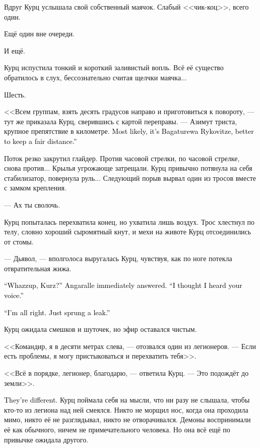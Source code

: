 \documentclass[a4paper,10pt,fleqn]{book}\usepackage{polyglossia}\setdefaultlanguage{english}\setotherlanguage{russian}\defaultfontfeatures{Ligatures=TeX,Mapping=tex-text}\usepackage{xcolor}\definecolor{lightgray}{HTML}{bbbbbb}\color{lightgray}\newcommand{\ml}[3]{\textcolor{black}{#3}}
\begin{document}
Вдруг Курц услышала свой собственный маячок.
Слабый <<чик-коц>>, всего один.

Ещё один вне очереди.

И ещё.

Курц испустила тонкий и короткий заливистый вопль.
Всё её существо обратилось в слух, бессознательно считая щелчки маячка...

Шесть.

<<Всем группам, взять десять градусов направо и приготовиться к повороту, --- тут же приказала Курц, сверившись с картой переправы.
--- Азимут триста, крупное препятствие в километре.
\ml{$0$}
{Скорее всего, это Багатурева Рыковице, от неё лучше держаться подальше>>.}
{Most likely, it's Bagaturewa Rykovitze, better to keep a fair distance.''}

Поток резко закрутил глайдер.
Против часовой стрелки, по часовой стрелке, снова против...
Крылья угрожающе затрещали.
Курц привычно потянула на себя стабилизатор, повернула руль...
Следующий порыв вырвал один из тросов вместе с замком крепления.

--- Ах ты сволочь.

Курц попыталась перехватила конец, но ухватила лишь воздух.
Трос хлестнул по телу, словно хороший сыромятный кнут, и мехи на животе Курц отсоединились от стомы.

--- Дьявол, --- вполголоса выругалась Курц, чувствуя, как по ноге потекла отвратительная жижа.

\ml{$0$}
{<<Что такое, Курц? --- тут же отозвалась Анкарьяль.}
{``Whazzup, Kurz?'' Angaralle immediately answered.}
\ml{$0$}
{--- Мне послышался твой голос>>.}
{``I thought I heard your voice.''}

\ml{$0$}
{<<Всё нормально.}
{``I'm all right.}
\ml{$0$}
{Я просто немного дала течь>>.}
{Just sprung a leak.''}

Курц ожидала смешков и шуточек, но эфир оставался чистым.

<<Командир, я в десяти метрах слева, --- отозвался один из легионеров.
--- Если есть проблемы, я могу пристыковаться и перехватить тебя>>.

<<Всё в порядке, легионер, благодарю, --- ответила Курц.
--- Это подождёт до земли>>.

\ml{$0$}
{<<Они другие>>.}
{They're different.}
Курц поймала себя на мысли, что ни разу не слышала, чтобы кто-то из легиона над ней смеялся.
Никто не морщил нос, когда она проходила мимо, никто её не разглядывал, никто не отворачивался.
Демоны воспринимали её как обычного, ничем не примечательного человека.
Но она всё ещё по привычке ожидала другого.
\end{document}
